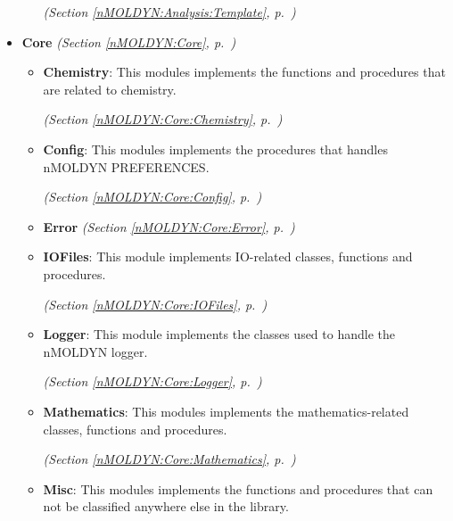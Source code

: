 \begin{itemize}
\begin{itemize}
  \textit{(Section \ref{nMOLDYN:Analysis:Template}, p.~\pageref{nMOLDYN:Analysis:Template})}

  \end{itemize}
\item \textbf{Core}
  \textit{(Section \ref{nMOLDYN:Core}, p.~\pageref{nMOLDYN:Core})}

  \begin{itemize}
\setlength{\parskip}{0ex}
    \item \textbf{Chemistry}: This modules implements the functions and procedures that are related to chemistry.



  \textit{(Section \ref{nMOLDYN:Core:Chemistry}, p.~\pageref{nMOLDYN:Core:Chemistry})}

    \item \textbf{Config}: 
This modules implements the procedures that handles nMOLDYN PREFERENCES.



  \textit{(Section \ref{nMOLDYN:Core:Config}, p.~\pageref{nMOLDYN:Core:Config})}

    \item \textbf{Error}
  \textit{(Section \ref{nMOLDYN:Core:Error}, p.~\pageref{nMOLDYN:Core:Error})}

    \item \textbf{IOFiles}: This module implements IO-related classes, functions and procedures.



  \textit{(Section \ref{nMOLDYN:Core:IOFiles}, p.~\pageref{nMOLDYN:Core:IOFiles})}

    \item \textbf{Logger}: This module implements the classes used to handle the nMOLDYN logger.



  \textit{(Section \ref{nMOLDYN:Core:Logger}, p.~\pageref{nMOLDYN:Core:Logger})}

    \item \textbf{Mathematics}: This modules implements the mathematics-related classes, functions and procedures.



  \textit{(Section \ref{nMOLDYN:Core:Mathematics}, p.~\pageref{nMOLDYN:Core:Mathematics})}

    \item \textbf{Misc}: This modules implements the functions and procedures that can not be classified anywhere else in 
the library.




\end{itemize}
\end{itemize}
